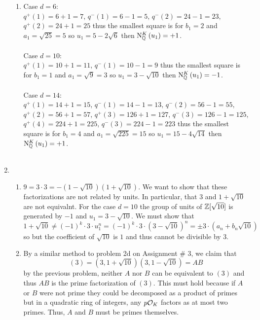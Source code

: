 \documentclass[12pt]{extarticle}
\begin{document}
\begin{enumerate}
\begin{enumerate}
\item  Case $d = 6$: \\
$q^+(1) = 6 + 1 = 7$, $q^-(1) = 6 - 1 = 5$, $q^-(2) = 24 - 1 = 23$, $q^+(2) = 24 + 1 = 25$ thus the smallest square is for $b_1 = 2$ and $a_1 = \sqrt{25} = 5$ so $u_1 = 5 - 2 \sqrt{6}$ then $\mathrm{N}^{K}_{\mathbb{Q}}\left(u_1\right) = +1$. \\\\
Case $d = 10$: \\
$q^+(1) = 10 + 1 = 11$, $q^-(1) = 10 - 1 = 9$ thus the smallest square is for $b_1 = 1$ and $a_1 = \sqrt{9} = 3$ so $u_1 = 3 - \sqrt{10}$ then $\mathrm{N}^{K}_{\mathbb{Q}}\left(u_1\right) = -1$. \\\\
Case $d = 14$: \\
$q^+(1) = 14 + 1 = 15$, $q^-(1) = 14 - 1 = 13$, $q^-(2) = 56 - 1 = 55$, $q^+(2) = 56 + 1 = 57$, $q^+(3) = 126 + 1 = 127$, $q^-(3) = 126 - 1 = 125$, $q^+(4) = 224 + 1 = 225$, $q^-(3) = 224 - 1 = 223$ thus the smallest square is for $b_1 = 4$ and $a_1 = \sqrt{225} = 15$ so $u_1 = 15 - 4 \sqrt{14}$ then $\mathrm{N}^{K}_{\mathbb{Q}}\left(u_1\right) = +1$. \\\\

\end{enumerate}

\item

\begin{enumerate}
\item $9 = 3 \cdot 3 = -(1 - \sqrt{10})(1 + \sqrt{10})$. We want to show that these factorizations are not related by units. In particular, that $3$ and $1 + \sqrt{10}$ are not equivalnt. For the case $d = 10$ the group of units of $\mathbb{Z}[\sqrt{10}]$ is generated by $-1$ and $u_1 = 3 - \sqrt{10}$. We must show that \[1 + \sqrt{10} \neq (-1)^k \cdot 3 \cdot u_1^n = (-1)^k \cdot 3 \cdot (3 - \sqrt{10})^n = \pm 3 \cdot (a_n + b_n \sqrt{10})\]
so but the coefficient of $\sqrt{10}$ is $1$ and thus cannot be divisible by $3$.  

\item By a similar method to problem 2d on Assignment \# 3, we claim that \[(3) = (3, 1 + \sqrt{10}) (3, 1 - \sqrt{10}) = AB\] by the previous problem, neither $A$ nor $B$ can be equivalent to $(3)$ and thus $AB$ is the prime factorization of $(3)$. This must hold because if $A$ or $B$ were not prime they could be decomposed as a product of primes but in a quadratic ring of integers, any $p \mathcal{O}_{K}$ factors as at most two primes. Thus, $A$ and $B$ must be primes themselves.  


\end{enumerate}
\end{enumerate}
\end{document}
